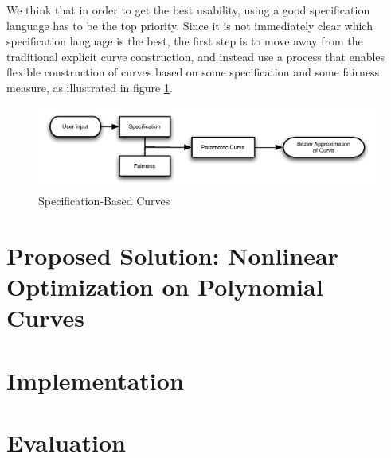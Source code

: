 \documentclass[a4paper]{article}
\begin{document}
			We think that in order to get the best usability, using a good specification language has to be the top priority. Since it is not immediately clear which specification language is the best, the first step is to move away from the traditional explicit curve construction, and instead use a process that enables flexible construction of curves based on some specification and some fairness measure, as illustrated in figure \ref{figure:specification-based_curves}.

			\begin{figure}[htb]
				\centering
				\includegraphics[width=\textwidth]{../resources/specification-based_curves.pdf}
				\caption{Specification-Based Curves}
				\label{figure:specification-based_curves}
			\end{figure}

	\section{Proposed Solution: Nonlinear Optimization on Polynomial Curves}


	\section{Implementation}

	\section{Evaluation}
\end{document}
